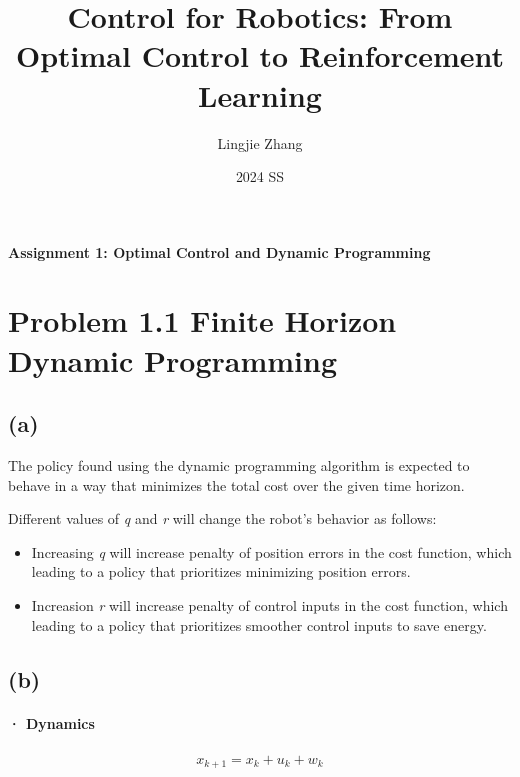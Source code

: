 \documentclass[8pt, a4paper, oneside, justified]{article}
\title{Control for Robotics: From Optimal Control to Reinforcement Learning}
\author{Lingjie Zhang}
\date{2024 SS}
\numberwithin{equation}{section}
\begin{document}
\maketitle

\begin{center}
    \textbf{Assignment 1: Optimal Control and Dynamic Programming}
\end{center}

\tableofcontents
\newpage
{}


\section*{Problem 1.1 Finite Horizon Dynamic Programming}
\setcounter{equation}{0} %
\subsection*{(a)}

The policy found using the dynamic programming algorithm is expected to behave in a way 
that minimizes the total cost over the given time horizon.

Different values of \textit{q} and \textit{r} will change the robot's behavior as follows:
\begin{itemize}
    \item Increasing \textit{q} will increase penalty of position errors in the cost function, 
    which leading to a policy that prioritizes minimizing position errors.
    \item Increasion \textit{r} will increase penalty of control inputs in the cost function, 
    which leading  to a policy that  prioritizes smoother control inputs to save energy.
\end{itemize}

\subsection*{(b)}
\paragraph*{· Dynamics}

\begin{align}
    x_{k+1}=x_k+u_k+w_k
\end{align}
\end{document}
